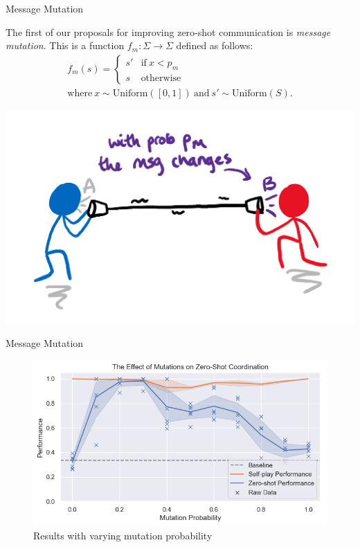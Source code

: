 \begin{frame}{Message Mutation}


    The first of our proposals for improving zero-shot communication is \emph{message mutation}. This is a function $f_m : \Sigma \rightarrow \Sigma$ defined as follows: 
    \begin{equation}
    \begin{gathered}
    f_m(s) = \begin{cases}
        s' & \text{if}~x < p_m \\
        s & \text{otherwise}
    \end{cases} \\
    \text{where}~x\sim \text{Uniform}([0, 1]) ~\text{and}~ s' \sim \text{Uniform}(S).
    \end{gathered}
    \end{equation}
    
    \begin{center}
        \includegraphics[width=0.6\linewidth]{figures/msg_mutation_cartoon.png}
    \end{center}
    
    
\end{frame}

\begin{frame}{Message Mutation}
    
    \begin{figure}
        \centering
        \includegraphics[width=1\linewidth]{figures/p_mutate_and_zs_coordination.png}
        \caption{Results with varying mutation probability}
        \label{fig:arch_diagram}
    \end{figure}
    
\end{frame}

